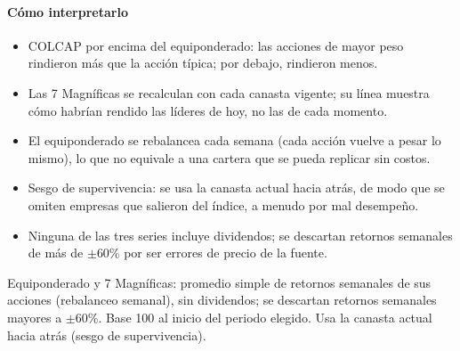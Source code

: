 \paragraph{Cómo interpretarlo}
\begin{itemize}
\item COLCAP por encima del equiponderado: las acciones de mayor peso rindieron más que la acción típica; por debajo, rindieron menos.
\item Las 7 Magníficas se recalculan con cada canasta vigente; su línea muestra cómo habrían rendido las líderes de hoy, no las de cada momento.
\item El equiponderado se rebalancea cada semana (cada acción vuelve a pesar lo mismo), lo que no equivale a una cartera que se pueda replicar sin costos.
\item Sesgo de supervivencia: se usa la canasta actual hacia atrás, de modo que se omiten empresas que salieron del índice, a menudo por mal desempeño.
\item Ninguna de las tres series incluye dividendos; se descartan retornos semanales de más de $\pm$60\% por ser errores de precio de la fuente.
\end{itemize}
\begin{formulas}[Fórmulas]
\end{formulas}
\begin{metodo}[Metodología]
Equiponderado y 7 Magníficas: promedio simple de retornos semanales de sus acciones (rebalanceo semanal), sin dividendos; se descartan retornos semanales mayores a $\pm$60\%. Base 100 al inicio del periodo elegido. Usa la canasta actual hacia atrás (sesgo de supervivencia).
\par{}
\end{metodo}

